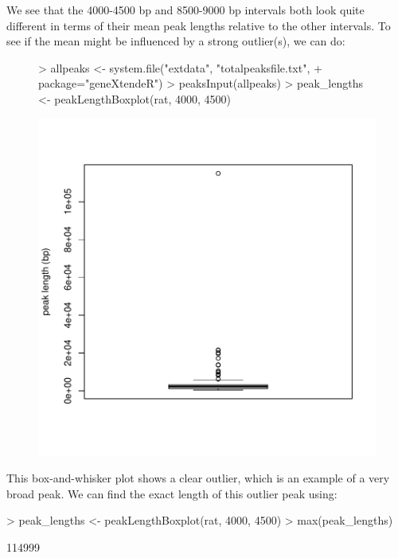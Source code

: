 \documentclass[12pt]{article}
\begin{document}
We see that the 4000-4500 bp and 8500-9000 bp intervals both look quite different in terms of their mean peak lengths relative to the other intervals.  To see if the mean might be influenced by a strong outlier(s), we can do:

\begin{figure}[H]
\begin{center}
\begin{Schunk}
\begin{Sinput}
> allpeaks <- system.file("extdata", "totalpeaksfile.txt",
+                         package="geneXtendeR")
> peaksInput(allpeaks)
> peak_lengths <- peakLengthBoxplot(rat, 4000, 4500)
\end{Sinput}
\end{Schunk}
\includegraphics{geneXtendeR-023}
\end{center}
\end{figure}

This box-and-whisker plot shows a clear outlier, which is an example of a very broad peak.  We can find the exact length of this outlier peak using: 

\begin{Schunk}
\begin{Sinput}
> peak_lengths <- peakLengthBoxplot(rat, 4000, 4500)
> max(peak_lengths)
\end{Sinput}
\begin{Soutput}
[1] 114999
\end{Soutput}
\end{Schunk}
\end{document}
